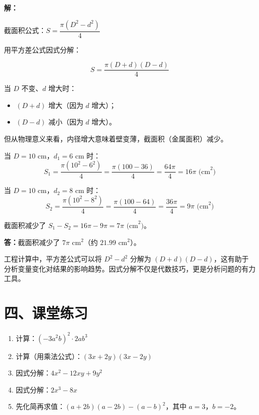 \documentclass[12pt, a4paper]{ctexart}
\begin{document}
\textbf{解：}

截面积公式：$S = \dfrac{\pi(D^2 - d^2)}{4}$

用平方差公式因式分解：

$$S = \frac{\pi(D + d)(D - d)}{4}$$

当 $D$ 不变、$d$ 增大时：
\begin{itemize}[nosep]
  \item $(D + d)$ 增大（因为 $d$ 增大）；
  \item $(D - d)$ 减小（因为 $d$ 增大）。
\end{itemize}

但从物理意义来看，内径增大意味着壁变薄，截面积（金属面积）减少。

当 $D = 10$ cm，$d_1 = 6$ cm 时：
$$S_1 = \frac{\pi(10^2 - 6^2)}{4} = \frac{\pi(100 - 36)}{4} = \frac{64\pi}{4} = 16\pi \text{ (cm}^2\text{)}$$

当 $D = 10$ cm，$d_2 = 8$ cm 时：
$$S_2 = \frac{\pi(10^2 - 8^2)}{4} = \frac{\pi(100 - 64)}{4} = \frac{36\pi}{4} = 9\pi \text{ (cm}^2\text{)}$$

截面积减少了 $S_1 - S_2 = 16\pi - 9\pi = 7\pi \text{ (cm}^2\text{)}$。

\textbf{答：}截面积减少了 $7\pi$ cm$^2$（约 $21.99$ cm$^2$）。

\begin{tipbox}[方法总结]
工程计算中，平方差公式可以将 $D^2 - d^2$ 分解为 $(D+d)(D-d)$，这有助于分析变量变化对结果的影响趋势。因式分解不仅是代数技巧，更是分析问题的有力工具。
\end{tipbox}

\section*{\textcolor{tipgreen}{四、课堂练习}}

\begin{enumerate}
  \item 计算：$(-3a^2b)^2 \cdot 2ab^3$

  \item 计算（用乘法公式）：$(3x + 2y)(3x - 2y)$

  \item 因式分解：$4x^2 - 12xy + 9y^2$

  \item 因式分解：$2x^3 - 8x$

  \item 先化简再求值：$(a + 2b)(a - 2b) - (a - b)^2$，其中 $a = 3$，$b = -2$。
\end{enumerate}
\end{document}
